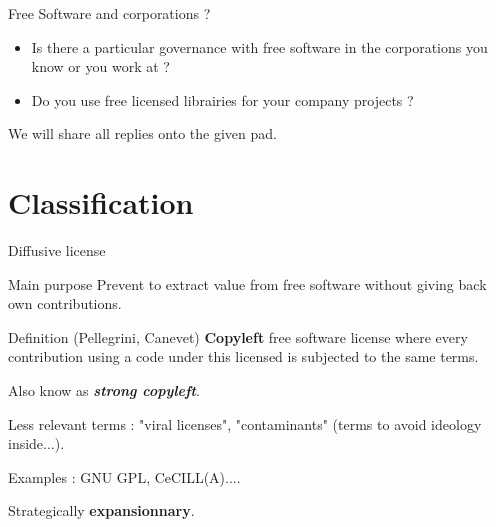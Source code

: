 \documentclass{beamer}
\begin{document}
\begin{frame}{Free Software and corporations ?}

  \begin{itemize}
  \item Is there a particular governance with free software in the corporations you know or you work at ?
  \item Do you use free licensed librairies for your company projects ? 
  \end{itemize}

We will share all replies onto the given pad.  
\end{frame}


\section{Classification}

\begin{frame}{Diffusive license}

  \begin{block}{Main purpose}
    Prevent to extract value from free software without giving back own contributions.
  \end{block}

  \begin{alertblock}{Definition (Pellegrini, Canevet)}
    \textbf{Copyleft} free software license where every contribution using a code under this licensed is subjected to the same terms.
   \end{alertblock}

Also know as \textit{\textbf{strong copyleft}}.

Less relevant terms : "viral licenses", "contaminants" (terms to avoid  ideology inside...).
  
Examples : GNU GPL, CeCILL(A)....

Strategically \textbf{expansionnary}.
\end{frame}

\end{document}
